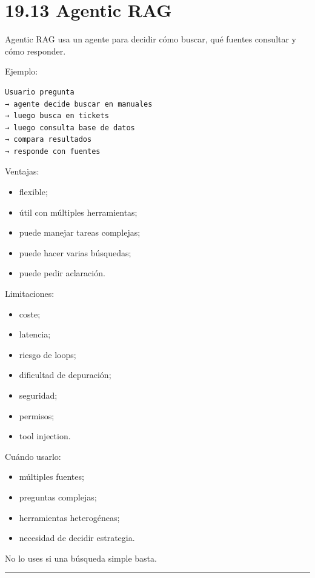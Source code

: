 \section{19.13 Agentic RAG}\label{agentic-rag}

Agentic RAG usa un agente para decidir cómo buscar, qué fuentes
consultar y cómo responder.

Ejemplo:

\begin{lstlisting}
Usuario pregunta
→ agente decide buscar en manuales
→ luego busca en tickets
→ luego consulta base de datos
→ compara resultados
→ responde con fuentes
\end{lstlisting}

Ventajas:

\begin{itemize}
\tightlist
\item
  flexible;
\item
  útil con múltiples herramientas;
\item
  puede manejar tareas complejas;
\item
  puede hacer varias búsquedas;
\item
  puede pedir aclaración.
\end{itemize}

Limitaciones:

\begin{itemize}
\tightlist
\item
  coste;
\item
  latencia;
\item
  riesgo de loops;
\item
  dificultad de depuración;
\item
  seguridad;
\item
  permisos;
\item
  tool injection.
\end{itemize}

Cuándo usarlo:

\begin{itemize}
\tightlist
\item
  múltiples fuentes;
\item
  preguntas complejas;
\item
  herramientas heterogéneas;
\item
  necesidad de decidir estrategia.
\end{itemize}

No lo uses si una búsqueda simple basta.

\begin{center}\rule{0.5\linewidth}{0.5pt}\end{center}

